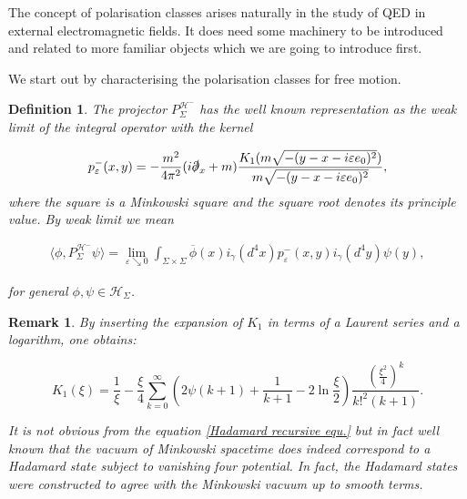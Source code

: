 \documentclass[a4paper,11pt]{article}
\newtheorem{de}{Definition}
\newtheorem{rmk}{Remark}
\begin{document}
The concept of polarisation classes arises naturally in the study of QED in external electromagnetic fields. It does need some
machinery to be introduced and related to more familiar objects which we are going to introduce first. 

We start out by characterising the polarisation classes for free motion.
\begin{de}
The projector \(P^{\mathcal{H}^-}_{\Sigma} \) has the well known representation as the weak limit of the integral operator 
with the kernel\cite{ivp2}

\begin{equation}
p^-_\varepsilon(x,y)= -\frac{m^2}{4\pi^2}(i\slashed{\partial}_x+m) \frac{K_1(m \sqrt{-(y-x-i \varepsilon e_0)^2})}{m \sqrt{-(y-x-i \varepsilon e_0)^2}},
\end{equation}
where the square is a Minkowski square and the square root denotes its principle value. By weak limit we mean

\begin{align}
\langle \phi, P^{\mathcal{H}^-}_{\Sigma} \psi\rangle = \lim_{\varepsilon \searrow 0} \int_{\Sigma\times \Sigma} \overline{\phi}(x) i_\gamma(d^4x) p^-_\varepsilon(x,y ) i_\gamma(d^4y) \psi(y),
\end{align}

for general \(\phi, \psi \in \mathcal{H}_\Sigma\).
\end{de}

\begin{rmk}
By inserting the expansion of \(K_1\) in terms of a Laurent series and a logarithm, \cite{abramowitz1965handbook} one obtains:

\begin{equation}\label{K1series}
K_1(\xi) = \frac{1}{\xi}- \frac{\xi}{4} \sum_{k=0}^\infty \left(2 \psi(k+1)+\frac{1}{k+1}-2 \ln\frac{ \xi}{2} \right) \frac{\left(\frac{\xi^2}{4}\right)^k}{k!^2 (k+1)}.
\end{equation}

It is not obvious from the equation \eqref{Hadamard recursive equ.} but in fact well known that the
 vacuum of Minkowski spacetime does indeed
correspond to  a Hadamard state subject to vanishing four potential. In fact, the Hadamard states were constructed to 
agree with the Minkowski vacuum up to smooth terms.
\end{rmk}
\end{document}
